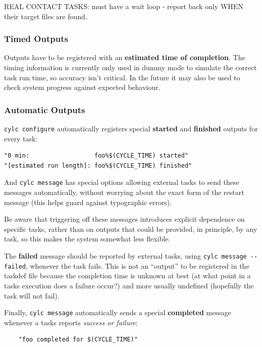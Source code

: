 \documentclass[11pt,a4paper]{article}
\begin{document}
REAL CONTACT TASKS: must have a wait loop - report back only WHEN their
target files are found.

\pagebreak

\subsubsection{Timed Outputs}

Outputs have to be registered with an {\bf estimated time of completion}.
The timing information is currently only used in dummy mode to simulate
the correct task run time, so accuracy isn't critical. In the future
it may also be used to check system progress against expected behaviour.

\subsubsection{Automatic Outputs}

\lstinline=cylc configure= automatically registers special {\bf started}
and {\bf finished} outputs for every task: 

\begin{lstlisting}
"0 min:                  foo%$(CYCLE_TIME) started"
"[estimated run length]: foo%$(CYCLE_TIME) finished"
\end{lstlisting}

And \lstinline=cylc message= has special options allowing external
tasks to send these messages automatically, without worrying about the
exact form of the restart message (this helps guard against typographic
errors).

Be aware that triggering off these messages introduces explicit
dependence on specific tasks, rather than on outputs that could be
provided, in principle, by any task, so this makes the system somewhat
less flexible.


The {\bf failed} message should be reported by external tasks, using 
\lstinline=cylc message --failed=, whenever the task fails. This is 
not an ``output'' to be registered in the taskdef file because the
completion time is unknown at best (at what point in a tasks execution
does a failure occur?) and more usually undefined (hopefully the task
will not fail). 

Finally, \lstinline=cylc message= automatically sends a special {\bf
completed} message whenever a tasks reports {\em success or failure}:
\begin{lstlisting}
    "foo completed for $(CYCLE_TIME)"
\end{lstlisting}
 
\end{document}

